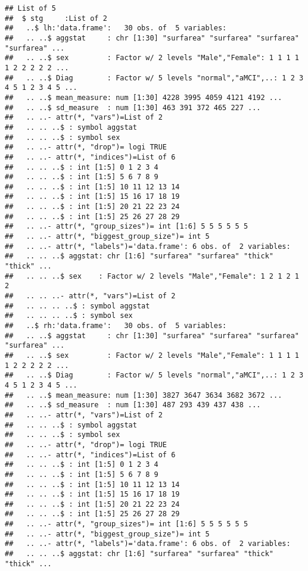 \documentclass[12pt]{article}
\begin{document}
\begin{knitrout}
\color{fgcolor}\begin{kframe}
\begin{verbatim}
## List of 5
##  $ stg     :List of 2
##   ..$ lh:'data.frame':	30 obs. of  5 variables:
##   .. ..$ aggstat     : chr [1:30] "surfarea" "surfarea" "surfarea" "surfarea" ...
##   .. ..$ sex         : Factor w/ 2 levels "Male","Female": 1 1 1 1 1 2 2 2 2 2 ...
##   .. ..$ Diag        : Factor w/ 5 levels "normal","aMCI",..: 1 2 3 4 5 1 2 3 4 5 ...
##   .. ..$ mean_measure: num [1:30] 4228 3995 4059 4121 4192 ...
##   .. ..$ sd_measure  : num [1:30] 463 391 372 465 227 ...
##   .. ..- attr(*, "vars")=List of 2
##   .. .. ..$ : symbol aggstat
##   .. .. ..$ : symbol sex
##   .. ..- attr(*, "drop")= logi TRUE
##   .. ..- attr(*, "indices")=List of 6
##   .. .. ..$ : int [1:5] 0 1 2 3 4
##   .. .. ..$ : int [1:5] 5 6 7 8 9
##   .. .. ..$ : int [1:5] 10 11 12 13 14
##   .. .. ..$ : int [1:5] 15 16 17 18 19
##   .. .. ..$ : int [1:5] 20 21 22 23 24
##   .. .. ..$ : int [1:5] 25 26 27 28 29
##   .. ..- attr(*, "group_sizes")= int [1:6] 5 5 5 5 5 5
##   .. ..- attr(*, "biggest_group_size")= int 5
##   .. ..- attr(*, "labels")='data.frame':	6 obs. of  2 variables:
##   .. .. ..$ aggstat: chr [1:6] "surfarea" "surfarea" "thick" "thick" ...
##   .. .. ..$ sex    : Factor w/ 2 levels "Male","Female": 1 2 1 2 1 2
##   .. .. ..- attr(*, "vars")=List of 2
##   .. .. .. ..$ : symbol aggstat
##   .. .. .. ..$ : symbol sex
##   ..$ rh:'data.frame':	30 obs. of  5 variables:
##   .. ..$ aggstat     : chr [1:30] "surfarea" "surfarea" "surfarea" "surfarea" ...
##   .. ..$ sex         : Factor w/ 2 levels "Male","Female": 1 1 1 1 1 2 2 2 2 2 ...
##   .. ..$ Diag        : Factor w/ 5 levels "normal","aMCI",..: 1 2 3 4 5 1 2 3 4 5 ...
##   .. ..$ mean_measure: num [1:30] 3827 3647 3634 3682 3672 ...
##   .. ..$ sd_measure  : num [1:30] 487 293 439 437 438 ...
##   .. ..- attr(*, "vars")=List of 2
##   .. .. ..$ : symbol aggstat
##   .. .. ..$ : symbol sex
##   .. ..- attr(*, "drop")= logi TRUE
##   .. ..- attr(*, "indices")=List of 6
##   .. .. ..$ : int [1:5] 0 1 2 3 4
##   .. .. ..$ : int [1:5] 5 6 7 8 9
##   .. .. ..$ : int [1:5] 10 11 12 13 14
##   .. .. ..$ : int [1:5] 15 16 17 18 19
##   .. .. ..$ : int [1:5] 20 21 22 23 24
##   .. .. ..$ : int [1:5] 25 26 27 28 29
##   .. ..- attr(*, "group_sizes")= int [1:6] 5 5 5 5 5 5
##   .. ..- attr(*, "biggest_group_size")= int 5
##   .. ..- attr(*, "labels")='data.frame':	6 obs. of  2 variables:
##   .. .. ..$ aggstat: chr [1:6] "surfarea" "surfarea" "thick" "thick" ...

\end{verbatim}
\end{kframe}
\end{knitrout}
\end{document}
